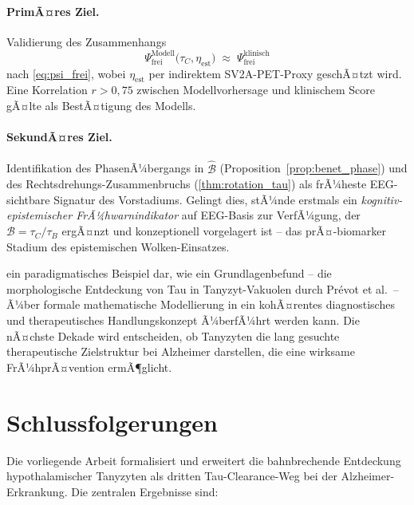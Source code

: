 ﻿\documentclass[12pt,a4paper]{article}
\theoremstyle{definition}
\begin{document}
	\paragraph{PrimÃ¤res Ziel.}
	Validierung des Zusammenhangs
	\[
		\Psi_{\mathrm{frei}}^{\mathrm{Modell}}\bigl(\tau_C, \eta_{\mathrm{est}}\bigr) \;\approx\; \Psi_{\mathrm{frei}}^{\mathrm{klinisch}}
	\]
	nach \cref{eq:psi_frei}, wobei $\eta_{\mathrm{est}}$ per indirektem SV2A-PET-Proxy geschÃ¤tzt wird. Eine Korrelation $r > 0{,}75$ zwischen Modellvorhersage und klinischem Score gÃ¤lte als BestÃ¤tigung des Modells.
	\paragraph{SekundÃ¤res Ziel.}
	Identifikation des PhasenÃ¼bergangs in $\hat{\mathcal{B}}$ (Proposition~\ref{prop:benet_phase}) und des Rechtsdrehungs-Zusammenbruchs (\cref{thm:rotation_tau}) als frÃ¼heste EEG-sichtbare Signatur des Vorstadiums. Gelingt dies, stÃ¼nde erstmals ein \emph{kognitiv-epistemischer FrÃ¼hwarnindikator} auf EEG-Basis zur VerfÃ¼gung, der $\mathcal{B} = \tau_C/\tau_B$ ergÃ¤nzt und konzeptionell vorgelagert ist -- das prÃ¤-biomarker Stadium des epistemischen Wolken-Einsatzes.

	 ein paradigmatisches Beispiel dar, wie ein Grundlagenbefund -- die morphologische Entdeckung von Tau in Tanyzyt-Vakuolen durch Pr\'evot et al.\ -- Ã¼ber formale mathematische Modellierung in ein kohÃ¤rentes diagnostisches und therapeutisches Handlungskonzept Ã¼berfÃ¼hrt werden kann. Die nÃ¤chste Dekade wird entscheiden, ob Tanyzyten die lang gesuchte therapeutische Zielstruktur bei Alzheimer darstellen, die eine wirksame FrÃ¼hprÃ¤vention ermÃ¶glicht.
	
	\section{Schlussfolgerungen}
	
	Die vorliegende Arbeit formalisiert und erweitert die bahnbrechende Entdeckung hypothalamischer Tanyzyten als dritten Tau-Clearance-Weg bei der Alzheimer-Erkrankung. Die zentralen Ergebnisse sind:
	
\end{document}
